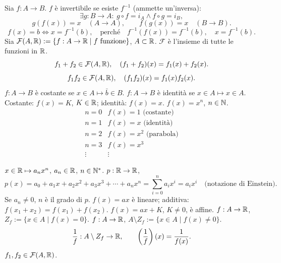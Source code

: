 Sia $f:A\to B$. $f$ è invertibile se esiste $f^{-1}$ (ammette un'inversa):
\[\exists g:B\to A:\ g\circ f=i_A\land f\circ g=i_B,\]
\[g(f(x))=x\quad(A\to A),\qquad f(g(x))=x\quad(B\to B).\]
\[f(x)=b\iff x=f^{-1}(b),\quad\text{perché}\quad f^{-1}(f(x))=f^{-1}(b),\quad x=f^{-1}(b).\]
Sia $\mathcal F(A,\mathbb R):=\{f:A\to\mathbb R\mid f\text{ funzione}\}$, $A\subset\mathbb R$.
$\mathcal F$ è l'insieme di tutte le funzioni in $\mathbb R$.
\[f_1+f_2\in\mathcal F(A,\mathbb R),\quad(f_1+f_2)(x)=f_1(x)+f_2(x).\]
\[f_1f_2\in\mathcal F(A,\mathbb R),\quad(f_1f_2)(x)=f_1(x)f_2(x).\]
$f:A\to B$ è costante se $x\in A\mapsto\bar b\in B$.
$f:A\to B$ è identità se $x\in A\mapsto x\in A$.
Costante: $f(x)=K$, $K\in\mathbb R$; identità: $f(x)=x$.
$f(x)=x^n$, $n\in\mathbb N$.
\[\begin{array}{c|l}n=0&f(x)=1\text{ (costante)}\\n=1&f(x)=x\text{ (identità)}\\n=2&f(x)=x^2\text{ (parabola)}\\n=3&f(x)=x^3\\\vdots&\vdots\end{array}\]
\begin{center}\end{center}
$x\in\mathbb R\mapsto a_nx^n$, $a_n\in\mathbb R$, $n\in\mathbb N^*$.
$p:\mathbb R\to\mathbb R$,
\[p(x)=a_0+a_1x+a_2x^2+a_3x^3+\cdots+a_nx^n=\sum_{i=0}^na_ix^i=a_ix^i\quad\text{(notazione di Einstein)}.\]
Se $a_n\ne0$, $n$ è il grado di $p$.
$f(x)=ax$ è lineare; additiva: $f(x_1+x_2)=f(x_1)+f(x_2)$.
$f(x)=ax+K$, $K\ne0$, è affine.
$f:A\to\mathbb R$, $Z_f:=\{x\in A\mid f(x)=0\}$.
$f:A\to\mathbb R$, $A\setminus Z_f:=\{x\in A\mid f(x)\ne0\}$.
\[\frac1f:A\setminus Z_f\to\mathbb R,\qquad\left(\frac1f\right)(x)=\frac1{f(x)}.\]
$f_1,f_2\in\mathcal F(A,\mathbb R)$.
